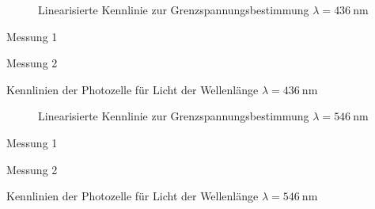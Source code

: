\begin{figure}
	\centering
	
	\caption{Linearisierte Kennlinie zur Grenzspannungsbestimmung $\lambda = \SI{436}{\nano\metre}$}
	\label{fig:kennlinien_436nm}
\end{figure}

\begin{table}
	\centering
	\begin{subtable}{0.5\textwidth}
		\centering
		\vspace{0pt}
		\resizebox{0.95\columnwidth}{!}{%
			
		}
		\caption{Messung 1}
	\end{subtable}%
	\begin{subtable}{0.5\textwidth}
		\centering
		\vspace{0pt}
		\resizebox{0.95\columnwidth}{!}{%
			
		}
		\caption{Messung 2}
	\end{subtable}

	\caption{Kennlinien der Photozelle f\"ur Licht der Wellenl\"ange $\lambda = \SI{436}{\nano\metre}$}
\end{table}



\begin{figure}
	\centering
	
	\caption{Linearisierte Kennlinie zur Grenzspannungsbestimmung $\lambda = \SI{546}{\nano\metre}$}
	\label{fig:kennlinien_546nm}
\end{figure}

\begin{table}
	\centering
	\begin{subtable}{0.5\textwidth}
		\centering
		\vspace{0pt}
		\resizebox{0.95\columnwidth}{!}{%
			
		}
		\caption{Messung 1}
	\end{subtable}%
	\begin{subtable}{0.5\textwidth}
		\centering
		\vspace{0pt}
		\resizebox{0.95\columnwidth}{!}{%
			
		}
		\caption{Messung 2}
	\end{subtable}

	\caption{Kennlinien der Photozelle f\"ur Licht der Wellenl\"ange $\lambda = \SI{546}{\nano\metre}$}
\end{table}



